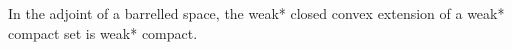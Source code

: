 In the adjoint of a barrelled space, the weak* closed convex extension of a weak* compact set is weak* compact.
